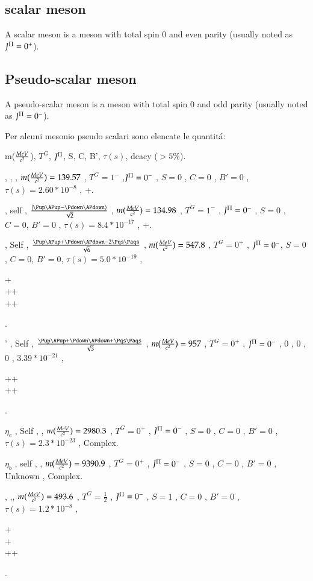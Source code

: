 \documentclass[main.tex]{subfiles}
\begin{document}
\subsection{scalar meson}
A scalar meson is a meson with total spin 0 and even parity (usually noted as $J^{\Pi}=0^+$).

\subsection{Pseudo-scalar meson}
A pseudo-scalar meson is a meson with total spin 0 and odd parity (usually noted as $J^{\Pi}=0^-$).

Per alcuni mesonio pseudo scalari sono elencate le quantit\'a:

m($\frac{MeV}{c^2}$), $T^G$, $J^{\Pi}$, S, C, B', $\tau (s)$, deacy ($>5\%$).

\begin{itemize*}
\item \Ppiplus , \Ppiminus , \Pup\Pdown , $m(\frac{MeV}{c^2})=139.57$ , $T^G=1^-$ ,$J^{\Pi}=0^-$ , $S=0$ , $C=0$ , $B'=0$ , $\tau (s)=2.60*10^{-8}$ , \APmuon+\Pnum.

\item \Ppizero , self , $\frac{\ket{\Pup\APup-\Pdown\APdown}}{\sqrt{2}}$ , $m(\frac{MeV}{c^2})=134.98$ , $T^G=1^-$ , $J^{\Pi}=0^-$ , $S=0$ , $C=0$, $B'=0$ , $\tau (s)=8.4*10^{-17}$ , \Pphoton+\Pphoton.

\item \Peta , Self , $\frac{\Pup\APup+\Pdown\APdown-2\Pqs\Paqs}{\sqrt{6}}$ , $m(\frac{MeV}{c^2})=547.8$ , $T^G=0^+$ , $J^{\Pi}=0^-$, $S=0$, $C=0$, $B'=0$, $\tau (s)=5.0*10^{-19}$ , \parbox{4cm}{\Pphoton+\Pphoton\\\Ppizero+\Ppizero+\Ppizero\\\Ppiplus+\Ppizero+\Ppiminus}.

\item \Peta' , Self , $\frac{\Pup\APup+\Pdown\APdown+\Pqs\Paqs}{\sqrt{3}}$ , $m(\frac{MeV}{c^2})=957$ , $T^G=0^+$ , $J^{\Pi}=0^-$ , 0 , 0 , 0 , $3.39*10^{-21}$ , \parbox{4cm}{\Ppizero+\Ppizero+\Peta\\\Ppiplus+\Ppiminus+\Peta}.

\item $\eta_c$ , Self , \Pqc\Paqc , $m(\frac{MeV}{c^2})=2980.3$ , $T^G=0^+$ , $J^{\Pi}=0^-$ , $S=0$ , $C=0$ , $B'=0$ , $\tau (s)=2.3*10^{-23}$ , Complex.

\item $\eta_b $ , self , \Pqb\Paqb , $m(\frac{MeV}{c^2})=9390.9$ , $T^G=0^+$ , $J^{\Pi}=0^-$ , $S=0$ , $C=0$ , $B'=0$ , Unknown , Complex.

\item \PKp , \PKm ,\Pup\Paqs , $m(\frac{MeV}{c^2})=493.6$ , $T^G=\frac{1}{2}$ , $J^{\Pi}=0^-$ , $S=1$ , $C=0$ , $B'=0$ , $\tau (s)=1.2*10^{-8}$ , \parbox{4cm}{\APmuon+\Pnum\\\Ppiplus+\Ppizero\\\Ppizero+\APelectron+\Pnue}.


\end{itemize*}
\end{document}
